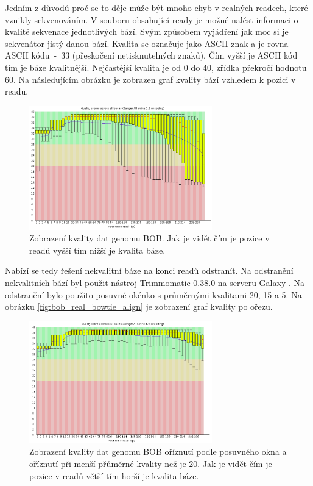\documentclass[czech,DP]{thesiskiv}
\numberwithin{equation}{section}
\begin{document}
\noindent
Jedním z důvodů proč se to děje může být mnoho chyb v realných readech, které vznikly sekvenováním. V souboru obsahující ready je možné nalést informaci o kvalitě sekvenace jednotlivých bází. Svým způsobem vyjádření jak moc si je sekvenátor jistý danou bází. Kvalita se označuje jako ASCII znak a je rovna ASCII kódu~-~33 (přeskočení netisknutelných znaků). Čím vyšší je ASCII kód tím je báze kvalitnější. Nejčastější kvalita je od 0 do 40, zřídka překročí hodnotu 60. Na následujícím obrázku je zobrazen graf kvality bází vzhledem k pozici v readu.


\begin{figure}[H]		
		\centering
		\includegraphics[width=300px]{./img/quality_graf_bob_no_trim.png}
		\caption{Zobrazení kvality dat genomu BOB. Jak je vidět čím je pozice v readů vyšší tím nižší je kvalita báze.}
		\label{fig:graf_quality_no_trim}
\end{figure}

\noindent
Nabízí se tedy řešení nekvalitní báze na konci readů odstranít. Na odstranění nekvalitních bází byl použit nástroj Trimmomatic 0.38.0 na serveru Galaxy \cite{galaxy}. Na odstranění bylo použito posuvné okénko s průměrnými kvalitami 20, 15 a 5. Na obrázku \ref{fig:bob_real_bowtie_align} je zobrazení graf kvality po ořezu. 


\begin{figure}[H]		
		\centering
		\includegraphics[width=300px]{./img/quality_graf_bob_trim_20.png}
		\caption{Zobrazení kvality dat genomu BOB oříznutí podle posuvného okna a oříznutí při menší přůměrné kvality než je 20. Jak je vidět čím je pozice v readů větší tím horší je kvalita báze.}
		\label{fig:graf_quality_trim}
\end{figure}
\end{document}
